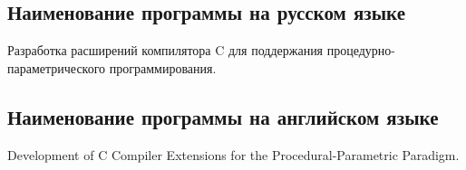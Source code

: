 \subsection{Наименование программы на русском языке}

Разработка расширений компилятора C для поддержания процедурно-параметрического программирования.

\subsection{Наименование программы на английском языке}

Development of C Compiler Extensions for the Procedural-Parametric Paradigm.
